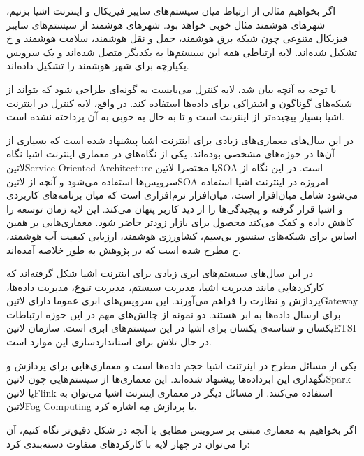 اگر بخواهیم مثالی از ارتباط میان سیستم‌های سایبر فیزیکال و اینترنت اشیا بزنیم، شهرهای هوشمند مثال خوبی خواهد بود. شهرهای هوشمند از سیستم‌های سایبر فیزیکال متنوعی چون
شبکه برق هوشمند، حمل و نقل هوشمند، سلامت هوشمند و ‌خ تشکیل شده‌اند. لایه ارتباطی همه این سیستم‌ها به یکدیگر متصل شده‌اند و یک سرویس یکپارچه برای شهر هوشمند را
تشکیل داده‌اند.

با توجه به آنچه بیان شد، لایه کنترل می‌بایست به گونه‌ای طراحی شود که بتواند از شبکه‌های گوناگون و اشتراکی برای داده‌ها استفاده کند.
در واقع، لایه کنترل در اینترنت اشیا بسیار پیچیده‌تر از اینترنت است و تا به حال به خوبی به آن پرداخته نشده است.


در این سال‌های معماری‌های زیادی برای اینترنت اشیا پیشنهاد شده است که بسیاری از آن‌ها در حوزه‌های مشخصی بوده‌اند.
یکی از نگاه‌های در معماری اینترنت اشیا نگاه ‌لاتین{Service Oriented Architecture} یا مختصرا ‌لاتین{SOA} است.
در این نگاه از سرویس‌ها استفاده می‌شود و آنچه از ‌لاتین{SOA} امروزه در اینترنت اشیا استفاده می‌شود شامل میان‌افزار است، میان‌افزار نرم‌افزاری است که
میان برنامه‌های کاربردی و اشیا قرار گرفته و پیچیدگی‌ها را از دید کاربر پنهان می‌کند. این لایه زمان توسعه را کاهش داده و کمک می‌کند محصول برای بازار
زودتر حاضر شود. معماری‌هایی بر همین اساس برای شبکه‌های سنسور بی‌سیم، کشاورزی هوشمند، ارزیابی کیفیت آب هوشمند، ‌خ مطرح شده است که در پژوهش  به طور خلاصه آمده‌اند.

در این سال‌های سیستم‌های ابری زیادی برای اینترنت اشیا شکل گرفته‌اند که کارکردهایی مانند مدیریت اشیا، مدیریت سیستم، مدیریت تنوع، مدیریت داده‌ها، پردازش و
نظارت را فراهم می‌آورند. این سرویس‌های ابری عموما دارای ‌لاتین{Gateway} برای ارسال داده‌ها به ابر هستند. دو نمونه از چالش‌های مهم در این حوزه ارتباطات یکسان و
شناسه‌ی یکسان برای اشیا در این سیستم‌های ابری است. سازمان ‌لاتین{ETSI} در حال تلاش برای استانداردسازی این موارد است.

یکی از مسائل مطرح در اینرتنت اشیا حجم داده‌ها است و معماری‌هایی برای پردازش و نگهداری این ابرداده‌ها پیشنهاد شده‌اند. این معماری‌ها از سیستم‌هایی چون ‌لاتین{Spark} یا ‌لاتین{Flink} استفاده می‌کنند.
از مسائل دیگر در معماری اینترنت اشیا می‌توان به ‌لاتین{Fog Computing} یا پردازش مِه اشاره کرد.

اگر بخواهیم به معماری مبتنی بر سرویس مطابق با آنچه در شکل  دقیق‌تر نگاه کنیم، آن را می‌توان در چهار لایه با کارکردهای متفاوت دسته‌بندی کرد:

